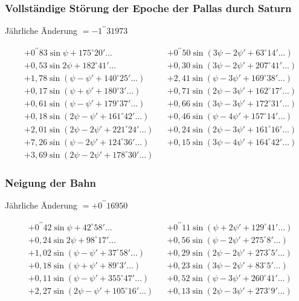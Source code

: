 \documentclass[10pt,a4paper]{article}
\begin{document}
\newpage
\subsubsection*{Vollständige Störung der Epoche der Pallas durch Saturn}

Jährliche Änderung $= -1^{\prime\prime}31973$

\begin{align*}
&+ 0^{\prime\prime}83 \sin \psi + 175^{\circ}20' \ldots && + 0^{\prime\prime}50 \sin(3\psi - 2\psi' + 63^{\circ}14' \ldots) \\
&+ 0,53 \sin 2\psi + 182^{\circ}41' \ldots && + 0,30 \sin(3\psi - 2\psi' + 207^{\circ}41' \ldots) \\
&+ 1,78 \sin(\psi - \psi' + 140^{\circ}25' \ldots) && + 2,41 \sin(\psi - 3\psi' + 169^{\circ}38' \ldots) \\
&+ 0,17 \sin(\psi + \psi' + 180^{\circ} 3' \ldots) && + 0,71 \sin(2\psi - 3\psi' + 162^{\circ}17' \ldots) \\
&+ 0,61 \sin(\psi - \psi' + 179^{\circ}37' \ldots) && + 0,66 \sin(3\psi - 3\psi' + 172^{\circ}31' \ldots) \\
&+ 0,18 \sin(2\psi - \psi' + 161^{\circ}42' \ldots) && + 0,46 \sin(\psi - 4\psi' + 157^{\circ}14' \ldots) \\
&+ 2,01 \sin(2\psi - 2\psi' + 221^{\circ}24' \ldots) && + 0,24 \sin(2\psi - 3\psi' + 161^{\circ}16' \ldots) \\
&+ 7,26 \sin(\psi - 2\psi' + 124^{\circ}36' \ldots) && + 0,15 \sin(3\psi - 4\psi' + 164^{\circ}42' \ldots) \\
&+ 3,69 \sin(2\psi - 2\psi' + 178^{\circ}30' \ldots)
\end{align*}

\subsubsection*{Neigung der Bahn}

Jährliche Änderung $= +0^{\prime\prime}16950$

\begin{align*}
&+ 0^{\prime\prime}42 \sin \psi + 42^{\circ}58' \ldots && + 0^{\prime\prime}11 \sin(\psi + 2\psi' + 129^{\circ}41' \ldots) \\
&+ 0,24 \sin 2\psi + 98^{\circ}17' \ldots && + 0,56 \sin(\psi - 2\psi' + 275^{\circ} 8' \ldots) \\
&+ 1,02 \sin(\psi - \psi' + 37^{\circ}58' \ldots) && + 0,29 \sin(2\psi - 2\psi' + 273^{\circ} 5' \ldots) \\
&+ 0,18 \sin(\psi + \psi' + 89^{\circ} 3' \ldots) && + 0,23 \sin(3\psi - 2\psi' + 83^{\circ} 5' \ldots) \\
&+ 0,11 \sin(\psi - \psi' + 355^{\circ}47' \ldots) && + 0,52 \sin(\psi - 3\psi' + 260^{\circ}41' \ldots) \\
&+ 2,27 \sin(2\psi - \psi' + 105^{\circ}16' \ldots) && + 0,13 \sin(2\psi - 3\psi' + 273^{\circ} 9' \ldots)
\end{align*}
\end{document}
